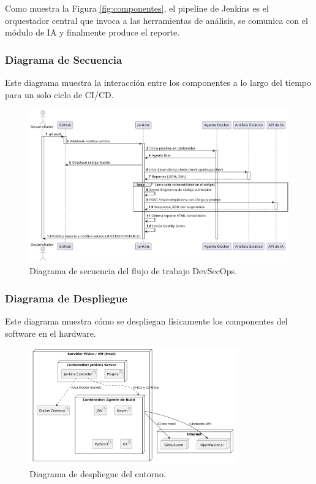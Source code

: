 Como muestra la Figura \ref{fig:componentes}, el pipeline de Jenkins es el orquestador central que invoca a las herramientas de análisis, se comunica con el módulo de IA y finalmente produce el reporte.

\subsubsection{Diagrama de Secuencia}

Este diagrama muestra la interacción entre los componentes a lo largo del tiempo para un solo ciclo de CI/CD.

\begin{figure}[h!]
\centering
\centering
    \includegraphics[width=1\textwidth]{contenido/imagenes/4_secuencia.pdf}
    \caption{Diagrama de secuencia del flujo de trabajo DevSecOps.}
    \label{fig:secuencia}
\end{figure}

\subsubsection{Diagrama de Despliegue}

Este diagrama muestra cómo se despliegan físicamente los componentes del software en el hardware.

\begin{figure}[h!]
\centering
\centering
    \includegraphics[width=0.8\textwidth]{contenido/imagenes/4_despliegue.pdf}
    \caption{Diagrama de despliegue del entorno.}
    \label{fig:despliegue}
\end{figure}

